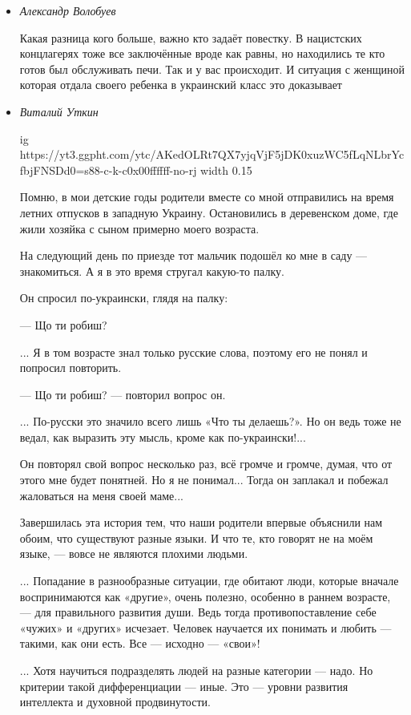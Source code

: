 \begin{itemize}
\item \emph{Александр Волобуев}

Какая разница кого больше, важно кто задаёт повестку. В нацистских концлагерях
тоже все заключённые вроде как равны, но находились те кто готов был
обслуживать печи. Так и у вас происходит. И ситуация с женщиной которая отдала
своего ребенка в украинский класс это доказывает

\item \emph{Виталий Уткин}
\par
\ifcmt
  ig https://yt3.ggpht.com/ytc/AKedOLRt7QX7yjqVjF5jDK0xuzWC5fLqNLbrYcfbjFNSDd0=s88-c-k-c0x00ffffff-no-rj
  width 0.15
\fi

Помню, в мои детские годы родители вместе со мной отправились на время летних
отпусков в западную Украину. Остановились в деревенском доме, где жили хозяйка
с сыном примерно моего возраста.

На следующий день по приезде тот мальчик подошёл ко мне в саду — знакомиться. А
я в это время стругал какую-то палку.

Он спросил по-украински, глядя на палку: 

— Що ти робиш?

... Я в том возрасте знал только русские слова, поэтому его не понял и попросил повторить.

— Що ти робиш? — повторил вопрос он.

... По-русски это значило всего лишь «Что ты делаешь?». Но он ведь тоже не ведал,
как выразить эту мысль, кроме как по-украински!...

Он повторял свой вопрос несколько раз, всё громче и громче, думая, что от этого
мне будет понятней. Но я не понимал... Тогда он заплакал и побежал жаловаться на
меня своей маме...

Завершилась эта история тем, что наши родители впервые объяснили нам обоим, что
существуют разные языки. И что те, кто говорят не на моём языке, — вовсе не
являются плохими людьми.

... Попадание в разнообразные ситуации, где обитают люди, которые вначале
воспринимаются как «другие», очень полезно, особенно в раннем возрасте, — для
правильного развития души. Ведь тогда противопоставление себе «чужих» и
«других» исчезает. Человек научается их понимать и любить — такими, как они
есть. Все — исходно — «свои»!

... Хотя научиться подразделять людей на разные категории — надо. Но критерии
такой дифференциации — иные. Это — уровни развития интеллекта и духовной
продвинутости.


\end{itemize}
